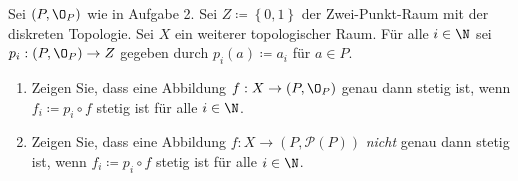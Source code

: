\begin{assignment}
  Sei \( (P, \O_P) \) wie in Aufgabe 2. Sei \( Z \coloneqq \left \{ 0,1 \right \} \) der Zwei-Punkt-Raum mit der diskreten Topologie. Sei \( X \) ein weiterer topologischer Raum. Für alle \( i \in \N \) sei \( p_i : (P, \O_P) \to Z \) gegeben durch \( p_i(a) \coloneqq a_i \) für \( a \in P \).
  \begin{enumerate}[label=(\alph*)]
    \item Zeigen Sie, dass eine Abbildung \( f: X \to (P,\O_P) \) genau dann stetig ist, wenn \( f_i \coloneqq p_i \circ f \) stetig ist für alle \( i \in \N \).
    \item Zeigen Sie, dass eine Abbildung \( f: X \to (P,\mathcal{P}(P)) \) \emph{nicht} genau dann stetig ist, wenn \( f_i \coloneqq p_i \circ f \) stetig ist für alle \( i \in \N \).
  \end{enumerate}
\end{assignment}
